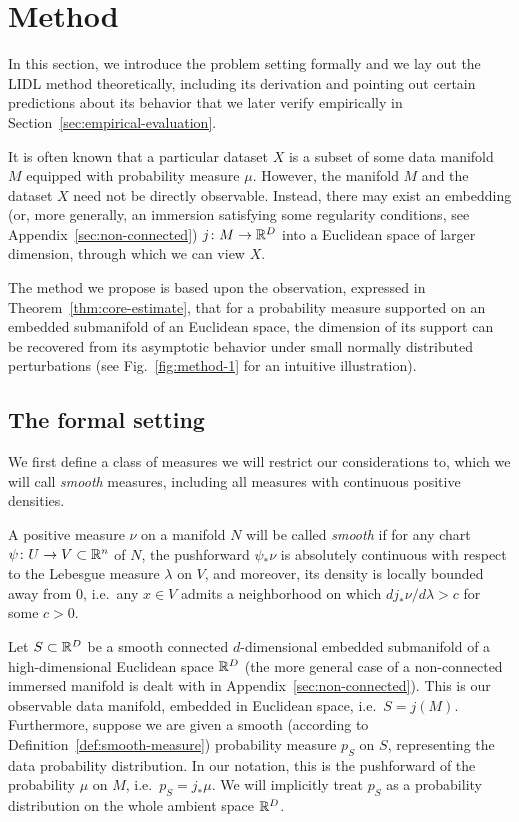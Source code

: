 
\section{Method}
\label{sec:method}
In this section, we introduce the problem setting formally and we lay out the LIDL method theoretically, including its derivation and pointing out certain predictions about its behavior that we later verify empirically in Section~\ref{sec:empirical-evaluation}.

It is often known that a particular dataset $X$ is a subset of some data manifold $M$ equipped with probability measure $\mu$. However, the manifold $M$ and the dataset $X$ need not be directly observable. Instead, there may exist an embedding (or, more generally, an immersion satisfying some regularity conditions, see Appendix~\ref{sec:non-connected}) $j\colon M\to\mathbb{R}^D$ into a Euclidean space of larger dimension, through which we can view $X$. 

The method we propose is based upon the observation, expressed in Theorem~\ref{thm:core-estimate}, that for a probability measure supported on an embedded submanifold of an Euclidean space, the dimension of its support can be recovered from its asymptotic behavior under small normally distributed perturbations (see Fig.~\ref{fig:method-1} for an intuitive illustration). 

\subsection{The formal setting}

We first define a class of measures we will restrict our considerations to, which we will call \emph{smooth} measures, including all measures with continuous positive densities.

\begin{definition}
\label{def:smooth-measure}
    A positive measure $\nu$ on a manifold $N$ will be called \emph{smooth} if for any chart $\psi\colon U\to V\subset\mathbb{R}^n$ of $N$, the pushforward $\psi_*\nu$ is absolutely continuous with respect to the Lebesgue measure $\lambda$ on $V$, and moreover, its density is locally bounded away from $0$, i.e.\ any $x\in V$ admits a neighborhood on which $dj_*\nu/d\lambda > c$ for some $c>0$.
\end{definition}


Let $S\subset\mathbb{R}^D$ be a smooth connected  $d$-dimensional embedded submanifold of a high-dimensional Euclidean space $\mathbb{R}^D$ (the more general case of a non-connected immersed manifold is dealt with in Appendix~\ref{sec:non-connected}).
This is our observable data manifold, embedded in Euclidean space, i.e.\ $S=j(M)$. Furthermore, suppose we are given a smooth (according to Definition~\ref{def:smooth-measure}) probability measure $p_S$ on $S$, representing the data probability distribution. In our notation, this is the pushforward of the probability $\mu$ on $M$, i.e.\ $p_S = j_*\mu$. We will implicitly treat $p_S$ as a probability distribution on the whole ambient space $\mathbb{R}^D$.

